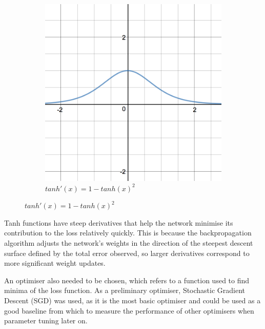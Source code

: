 \documentclass{l4proj}
\begin{document}
\begin{figure}[h]
\begin{subfigure}[b]{0.4\textwidth}
        \includegraphics[width=\textwidth]{images/tanh_prime.png}
        \caption{$tanh'(x) = 1 - tanh(x)^2$}
    \end{subfigure} 
\end{figure}

Tanh functions have steep derivatives that help the network minimise its contribution to the loss relatively quickly. This is because the backpropagation algorithm adjusts the network's weights in the direction of the steepest descent surface defined by the total error observed, so larger derivatives correspond to more significant weight updates.


An optimiser also needed to be chosen, which refers to a function used to find minima of the loss function. As a preliminary optimiser, Stochastic Gradient Descent (SGD) was used, as it is the most basic optimiser and could be used as a good baseline from which to measure the performance of other optimisers when parameter tuning later on.
\end{document}
